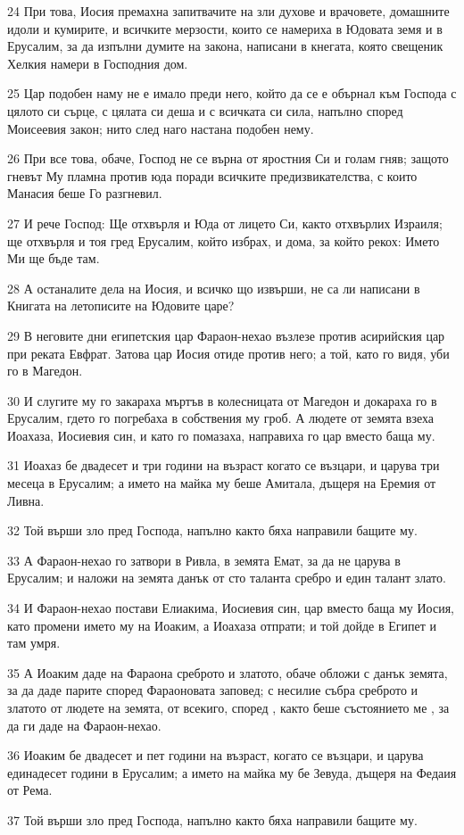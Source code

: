 \par 24 При това, Иосия премахна запитвачите на зли духове и врачовете, домашните идоли и кумирите, и всичките мерзости, които се намериха в Юдовата земя и в Ерусалим, за да изпълни думите на закона, написани в кнегата, която свещеник Хелкия намери в Господния дом.
\par 25 Цар подобен наму не е имало преди него, който да се е обърнал към Господа с цялото си сърце, с цялата си деша и с всичката си сила, напълно според Моисеевия закон; нито след наго настана подобен нему.
\par 26 При все това, обаче, Господ не се върна от яростния Си и голам гняв; защото гневът Му пламна против юда поради всичките предизвикателства, с които Манасия беше Го разгневил.
\par 27 И рече Господ: Ще отхвърля и Юда от лицето Си, както отхвърлих Израиля; ще отхвърля и тоя гред Ерусалим, който избрах, и дома, за който рекох: Името Ми ще бъде там.
\par 28 А останалите дела на Иосия, и всичко що извърши, не са ли написани в Книгата на летописите на Юдовите царе?
\par 29 В неговите дни египетския цар Фараон-нехао възлезе против асирийския цар при реката Евфрат. Затова цар Иосия отиде против него; а той, като го видя, уби го в Магедон.
\par 30 И слугите му го закараха мъртъв в колесницата от Магедон и докараха го в Ерусалим, гдето го погребаха в собствения му гроб. А людете от земята взеха Иоахаза, Иосиевия син, и като го помазаха, направиха го цар вместо баща му.
\par 31 Иоахаз бе двадесет и три години на възраст когато се възцари, и царува три месеца в Ерусалим; а името на майка му беше Амитала, дъщеря на Еремия от Ливна.
\par 32 Той върши зло пред Господа, напълно както бяха направили бащите му.
\par 33 А Фараон-нехао го затвори в Ривла, в земята Емат, за да не царува в Ерусалим; и наложи на земята данък от сто таланта сребро и един талант злато.
\par 34 И Фараон-нехао постави Елиакима, Иосиевия син, цар вместо баща му Иосия, като промени името му на Иоаким, а Иоахаза отпрати; и той дойде в Египет и там умря.
\par 35 А Иоаким даде на Фараона среброто и златото, обаче обложи с данък земята, за да даде парите според Фараоновата заповед; с несилие събра среброто и златото от людете на земята, от всекиго, според , както беше състоянието ме , за да ги даде на Фараон-нехао.
\par 36 Иоаким бе двадесет и пет години на възраст, когато се възцари, и царува единадесет години в Ерусалим; а името на майка му бе Зевуда, дъщеря на Федаия от Рема.
\par 37 Той върши зло пред Господа, напълно както бяха направили бащите му.

